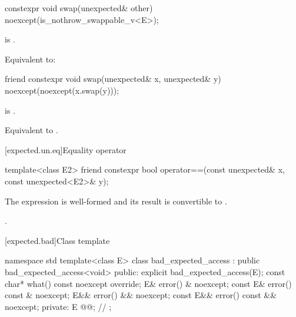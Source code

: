 %
\begin{itemdecl}
constexpr void swap(unexpected& other) noexcept(is_nothrow_swappable_v<E>);
\end{itemdecl}

\begin{itemdescr}
\pnum
\mandates
{} is .

\pnum
\effects
Equivalent to:
\end{itemdescr}

\begin{itemdecl}
friend constexpr void swap(unexpected& x, unexpected& y) noexcept(noexcept(x.swap(y)));
\end{itemdecl}

\begin{itemdescr}
\pnum
\constraints
{} is .

\pnum
\effects
Equivalent to .
\end{itemdescr}

[expected.un.eq]{Equality operator}

%
\begin{itemdecl}
template<class E2>
  friend constexpr bool operator==(const unexpected& x, const unexpected<E2>& y);
\end{itemdecl}

\begin{itemdescr}
\pnum
\mandates
The expression  is well-formed and
its result is convertible to .

\pnum
\returns
{}.
\end{itemdescr}

[expected.bad]{Class template }

%
\begin{codeblock}
namespace std {
  template<class E>
  class bad_expected_access : public bad_expected_access<void> {
  public:
    explicit bad_expected_access(E);
    const char* what() const noexcept override;
    E& error() & noexcept;
    const E& error() const & noexcept;
    E&& error() && noexcept;
    const E&& error() const && noexcept;
  private:
    E @@;              // \expos
  };
}
\end{codeblock}

